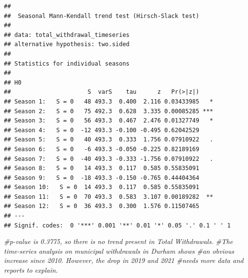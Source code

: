 \documentclass[
  12pt,
]{article}
\newenvironment{Shaded}{\begin{snugshade}}{\end{snugshade}}
\newcommand{\AttributeTok}[1]{\textcolor[rgb]{0.77,0.63,0.00}{#1}}
\newcommand{\CommentTok}[1]{\textcolor[rgb]{0.56,0.35,0.01}{\textit{#1}}}
\newcommand{\DecValTok}[1]{\textcolor[rgb]{0.00,0.00,0.81}{#1}}
\newcommand{\FunctionTok}[1]{\textcolor[rgb]{0.00,0.00,0.00}{#1}}
\newcommand{\NormalTok}[1]{#1}
\newcommand{\OtherTok}[1]{\textcolor[rgb]{0.56,0.35,0.01}{#1}}
\newcommand{\SpecialCharTok}[1]{\textcolor[rgb]{0.00,0.00,0.00}{#1}}
\newcommand{\StringTok}[1]{\textcolor[rgb]{0.31,0.60,0.02}{#1}}
\begin{document}
\begin{verbatim}
## 
##  Seasonal Mann-Kendall trend test (Hirsch-Slack test)
## 
## data: total_withdrawal_timeseries
## alternative hypothesis: two.sided
## 
## Statistics for individual seasons
## 
## H0
##                      S  varS    tau      z   Pr(>|z|)    
## Season 1:   S = 0   48 493.3  0.400  2.116 0.03433985   *
## Season 2:   S = 0   75 492.3  0.628  3.335 0.00085285 ***
## Season 3:   S = 0   56 493.3  0.467  2.476 0.01327749   *
## Season 4:   S = 0  -12 493.3 -0.100 -0.495 0.62042529    
## Season 5:   S = 0   40 493.3  0.333  1.756 0.07910922   .
## Season 6:   S = 0   -6 493.3 -0.050 -0.225 0.82189169    
## Season 7:   S = 0  -40 493.3 -0.333 -1.756 0.07910922   .
## Season 8:   S = 0   14 493.3  0.117  0.585 0.55835091    
## Season 9:   S = 0  -18 493.3 -0.150 -0.765 0.44404364    
## Season 10:   S = 0  14 493.3  0.117  0.585 0.55835091    
## Season 11:   S = 0  70 493.3  0.583  3.107 0.00189282  **
## Season 12:   S = 0  36 493.3  0.300  1.576 0.11507465    
## ---
## Signif. codes:  0 '***' 0.001 '**' 0.01 '*' 0.05 '.' 0.1 ' ' 1
\end{verbatim}

\begin{Shaded}
\begin{Highlighting}[]
\CommentTok{\#p{-}value is 0.3775, so there is no trend present in Total Withdrawals.}
\CommentTok{\#The time{-}series analysis on municipal withdrawals in Durham shows }
\CommentTok{\#an obvious increase since 2010. However, the drop in 2019 and 2021 }
\CommentTok{\#needs more data and reports to explain. }
\end{Highlighting}
\end{Shaded}

\begin{Shaded}
\end{Shaded}
\end{document}
